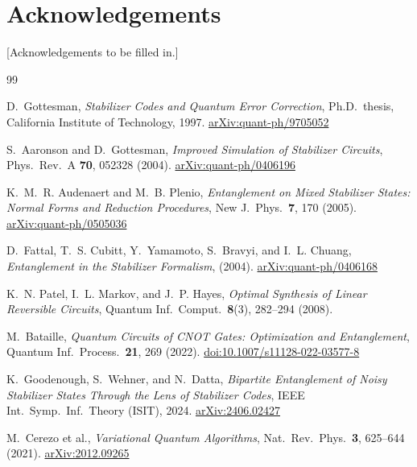 \documentclass[11pt,a4paper]{article}
\begin{document}
\section*{Acknowledgements}

[Acknowledgements to be filled in.]

\begin{thebibliography}{99}

D.~Gottesman,
\textit{Stabilizer Codes and Quantum Error Correction},
Ph.D.\ thesis, California Institute of Technology, 1997.
\href{https://arxiv.org/abs/quant-ph/9705052}{arXiv:quant-ph/9705052}

S.~Aaronson and D.~Gottesman,
\textit{Improved Simulation of Stabilizer Circuits},
Phys.\ Rev.\ A \textbf{70}, 052328 (2004).
\href{https://arxiv.org/abs/quant-ph/0406196}{arXiv:quant-ph/0406196}

K.~M.~R. Audenaert and M.~B. Plenio,
\textit{Entanglement on Mixed Stabilizer States: Normal Forms and
Reduction Procedures},
New J.\ Phys.\ \textbf{7}, 170 (2005).
\href{https://arxiv.org/abs/quant-ph/0505036}{arXiv:quant-ph/0505036}

D.~Fattal, T.~S. Cubitt, Y.~Yamamoto, S.~Bravyi, and I.~L. Chuang,
\textit{Entanglement in the Stabilizer Formalism},
(2004).
\href{https://arxiv.org/abs/quant-ph/0406168}{arXiv:quant-ph/0406168}

K.~N. Patel, I.~L. Markov, and J.~P. Hayes,
\textit{Optimal Synthesis of Linear Reversible Circuits},
Quantum Inf.\ Comput.\ \textbf{8}(3), 282--294 (2008).

M.~Bataille,
\textit{Quantum Circuits of CNOT Gates: Optimization and Entanglement},
Quantum Inf.\ Process.\ \textbf{21}, 269 (2022).
\href{https://doi.org/10.1007/s11128-022-03577-8}{doi:10.1007/s11128-022-03577-8}

K.~Goodenough, S.~Wehner, and N.~Datta,
\textit{Bipartite Entanglement of Noisy Stabilizer States Through the Lens
of Stabilizer Codes},
IEEE Int.\ Symp.\ Inf.\ Theory (ISIT), 2024.
\href{https://arxiv.org/abs/2406.02427}{arXiv:2406.02427}

M.~Cerezo et al.,
\textit{Variational Quantum Algorithms},
Nat.\ Rev.\ Phys.\ \textbf{3}, 625--644 (2021).
\href{https://arxiv.org/abs/2012.09265}{arXiv:2012.09265}


\end{thebibliography}
\end{document}
